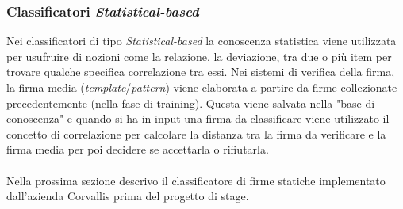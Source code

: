 \subsubsection*{Classificatori \emph{Statistical-based}}
\label{2.1.3.5}
Nei classificatori di tipo \emph{Statistical-based} la conoscenza statistica viene utilizzata per usufruire di nozioni come la relazione, la deviazione, tra due o più item per trovare qualche specifica correlazione tra essi. Nei sistemi di verifica della firma, la firma media (\emph{template}/\emph{pattern}) viene elaborata a partire da firme collezionate precedentemente (nella fase di training). Questa viene salvata nella "base di conoscenza" e quando si ha in input una firma da classificare viene utilizzato il concetto di correlazione per calcolare la distanza tra la firma da verificare e la firma media per poi decidere se accettarla o rifiutarla.\\\\
Nella prossima sezione descrivo il classificatore di firme statiche implementato dall'azienda Corvallis prima del progetto di stage.
